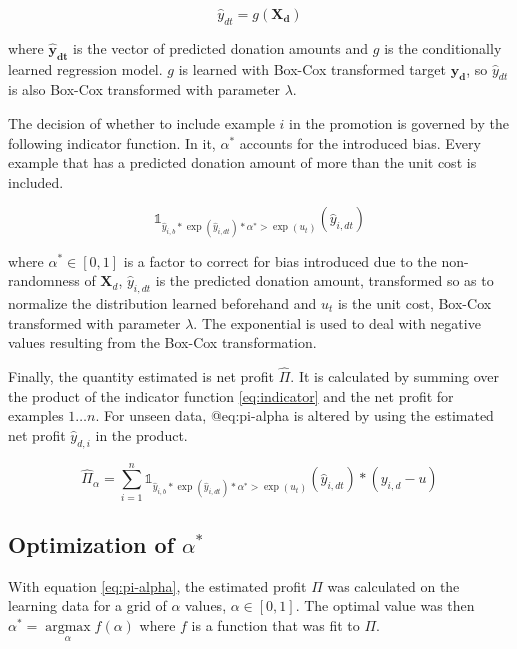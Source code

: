 \documentclass[
  11pt,
  a4paper,
  DIV=12,captions=tableheading,oneside,titlepage]{scrbook}
\begin{document}
\begin{equation}
\hat{y}_{dt} = g(\mathbf{X_d})
\label{eq:y-d}
\end{equation}

where \(\mathbf{\hat{y}_{dt}}\) is the vector of predicted donation amounts and \(g\) is the conditionally learned regression model. \(g\) is learned with Box-Cox transformed target \(\mathbf{y_d}\), so \(\hat{y}_{dt}\) is also Box-Cox transformed with parameter \(\lambda\).

The decision of whether to include example \(i\) in the promotion is governed by the following indicator function. In it, \(\alpha^*\) accounts for the introduced bias. Every example that has a predicted donation amount of more than the unit cost is included.

\begin{equation}
 \mathbb{1}_{\hat{y}_{i,b} * \exp(\hat{y}_{i,dt}) * \alpha^* > \exp(u_t)}(\hat{y}_{i,dt})
\label{eq:indicator}
\end{equation}

where \(\alpha^* \in [0,1]\) is a factor to correct for bias introduced due to the non-randomness of \(\mathbf{X}_d\), \(\hat{y}_{i,dt}\) is the predicted donation amount, transformed so as to normalize the distribution learned beforehand and \(u_t\) is the unit cost, Box-Cox transformed with parameter \(\lambda\). The exponential is used to deal with negative values resulting from the Box-Cox transformation.

Finally, the quantity estimated is net profit \(\hat{\Pi}\). It is calculated by summing over the product of the indicator function \eqref{eq:indicator} and the net profit for examples \(1 \ldots n\). For unseen data, @eq:pi-alpha is altered by using the estimated net profit \(\hat{y}_{d,i}\) in the product.

\begin{equation}
\hat{\Pi}_\alpha = \sum_{i=1}^n  \mathbb{1}_{\hat{y}_{i,b} * \exp(\hat{y}_{i,dt}) * \alpha^* > \exp(u_t)}(\hat{y}_{i,dt})*(y_{i,d} - u)
\label{eq:pi-alpha}
\end{equation}

\hypertarget{optimization-of-alpha}{%
\subsection{\texorpdfstring{Optimization of \(\alpha^*\)}{Optimization of \textbackslash{}alpha\^{}*}}\label{optimization-of-alpha}}

With equation \eqref{eq:pi-alpha}, the estimated profit \(\Pi\) was calculated on the learning data for a grid of \(\alpha\) values, \(\alpha \in [0,1]\). The optimal value was then \(\alpha^{*} = \underset{\alpha}{\operatorname{argmax}} f(\alpha)\) where \(f\) is a function that was fit to \(\Pi\).
\end{document}

